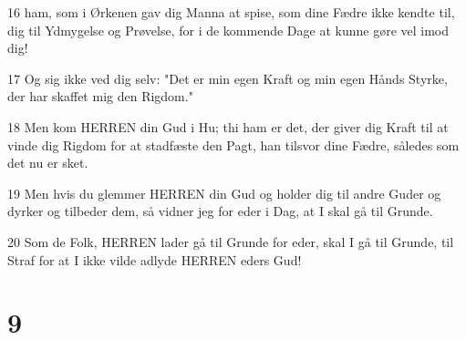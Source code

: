 \par 16 ham, som i Ørkenen gav dig Manna at spise, som dine Fædre ikke kendte til, dig til Ydmygelse og Prøvelse, for i de kommende Dage at kunne gøre vel imod dig!
\par 17 Og sig ikke ved dig selv: "Det er min egen Kraft og min egen Hånds Styrke, der har skaffet mig den Rigdom."
\par 18 Men kom HERREN din Gud i Hu; thi ham er det, der giver dig Kraft til at vinde dig Rigdom for at stadfæste den Pagt, han tilsvor dine Fædre, således som det nu er sket.
\par 19 Men hvis du glemmer HERREN din Gud og holder dig til andre Guder og dyrker og tilbeder dem, så vidner jeg for eder i Dag, at I skal gå til Grunde.
\par 20 Som de Folk, HERREN lader gå til Grunde for eder, skal I gå til Grunde, til Straf for at I ikke vilde adlyde HERREN eders Gud!

\chapter{9}

